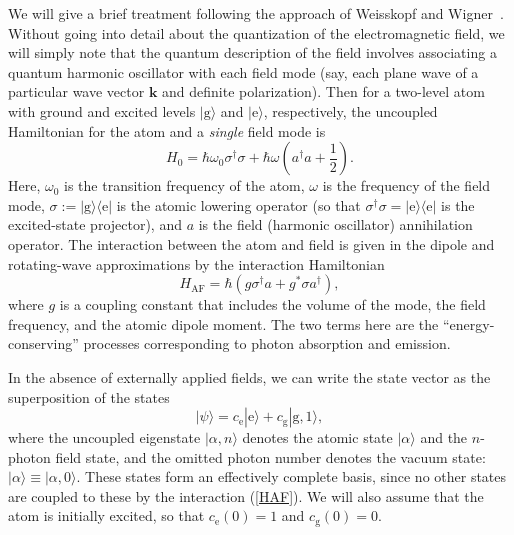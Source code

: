 \documentclass[12pt,aps,onecolum,superscriptaddress,footinbib,floatfix,showpacs]{revtex4-1}
\def\ket#1{|{#1}\rangle}
\def\bra#1{\langle{#1}|}
\def\eket{\ket{\mathrm{e}}}
\def\gket{\ket{\mathrm{g}}}
\def\ebra{\bra{\mathrm{e}}}
\def\goneket{\ket{\mathrm{g}, 1}}
\def\HAF{H_\mathrm{\scriptscriptstyle AF}}
\def\psiket{{| \psi \rangle}}
\def\ce{c_\mathrm{e}}
\def\cg{c_\mathrm{g}}
\begin{document}
We will give a brief treatment following the approach of 
Weisskopf and Wigner~\cite{Weisskopf30, Scully97, Milonni94}.
Without going into detail about the quantization of the electromagnetic
field, we will simply note that the quantum description of the 
field involves associating a quantum harmonic oscillator with each field mode 
(say, each plane wave of a particular wave vector $\mathbf{k}$ and
definite polarization).  Then for a two-level atom with 
ground and excited levels $\gket$ and $\eket$, respectively, the
uncoupled Hamiltonian for the atom and a \textit{single} field mode
is
\begin{equation}
  H_0 = \hbar\omega_{0}\sigma^\dagger\sigma
       +\hbar\omega
     \left(a^\dagger a+\frac{1}{2}\right).
\end{equation}
Here, $\omega_0$ is the transition frequency of the atom, 
$\omega$ is the frequency of the field mode,
$\sigma:=\gket\ebra$ is the atomic lowering operator (so that
$\sigma^\dagger\sigma=\eket\ebra$ is the excited-state projector), and
$a$ is the field (harmonic oscillator) annihilation operator.
The interaction between the atom and field is given in the dipole
and rotating-wave approximations by the interaction Hamiltonian
\begin{equation}
  \HAF =\hbar\left(g\sigma^\dagger a+g^*\sigma a^\dagger\right),
  \label{HAF}
\end{equation}
where $g$ is a coupling constant that includes the volume of the mode,
the field frequency, and the atomic dipole moment.
The two terms here are the ``energy-conserving'' processes
corresponding to photon absorption and emission.

In the absence of externally applied fields,
we can write the state vector as the superposition of the states
\begin{equation}
  \psiket = \ce \eket + \cg\goneket,
  \label{superpos}
\end{equation}
where the uncoupled eigenstate $\ket{\alpha, n}$ denotes the atomic state
$\ket\alpha$ and the $n$-photon field state, and the omitted photon number
denotes the vacuum state:
$\ket{\alpha}\equiv\ket{\alpha, 0}$.
These states form an effectively complete basis,
since no other states are coupled to these by
the interaction (\ref{HAF}).
We will also assume that the atom is initially excited, so that
$\ce(0)=1$ and $\cg(0)=0$.
\end{document}
